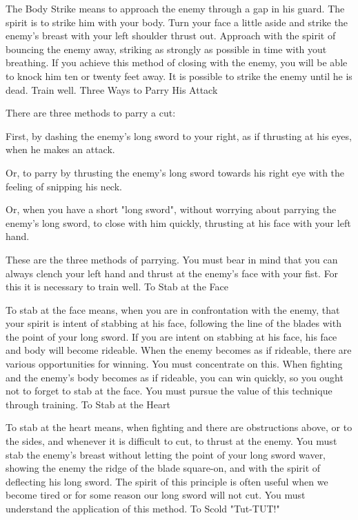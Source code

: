 The Body Strike means to approach the enemy through a gap in his guard. The spirit is to strike him with your body. Turn your face a little aside and strike the enemy's breast with your left shoulder thrust out. Approach with the spirit of bouncing the enemy away, striking as strongly as possible in time with yout breathing. If you achieve this method of closing with the enemy, you will be able to knock him ten or twenty feet away. It is possible to strike the enemy until he is dead. Train well.
Three Ways to Parry His Attack

There are three methods to parry a cut:

First, by dashing the enemy's long sword to your right, as if thrusting at his eyes, when he makes an attack.

Or, to parry by thrusting the enemy's long sword towards his right eye with the feeling of snipping his neck.

Or, when you have a short "long sword", without worrying about parrying the enemy's long sword, to close with him quickly, thrusting at his face with your left hand.

These are the three methods of parrying. You must bear in mind that you can always clench your left hand and thrust at the enemy's face with your fist. For this it is necessary to train well.
To Stab at the Face

To stab at the face means, when you are in confrontation with the enemy, that your spirit is intent of stabbing at his face, following the line of the blades with the point of your long sword. If you are intent on stabbing at his face, his face and body will become rideable. When the enemy becomes as if rideable, there are various opportunities for winning. You must concentrate on this. When fighting and the enemy's body becomes as if rideable, you can win quickly, so you ought not to forget to stab at the face. You must pursue the value of this technique through training.
To Stab at the Heart

To stab at the heart means, when fighting and there are obstructions above, or to the sides, and whenever it is difficult to cut, to thrust at the enemy. You must stab the enemy's breast without letting the point of your long sword waver, showing the enemy the ridge of the blade square-on, and with the spirit of deflecting his long sword. The spirit of this principle is often useful when we become tired or for some reason our long sword will not cut. You must understand the application of this method.
To Scold "Tut-TUT!"

